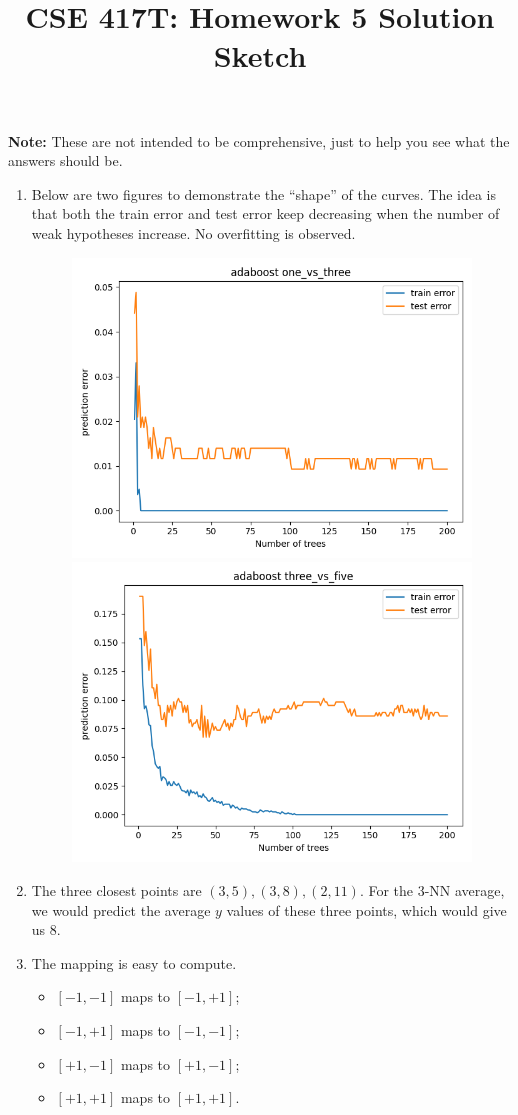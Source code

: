 \documentclass[10pt]{article}
\begin{document}
\title{CSE 417T: Homework 5 Solution Sketch}

\maketitle

\noindent \textbf{Note:} These are not intended to be comprehensive,
just to help you see what the answers should be.


\begin{enumerate}

\item

Below are two figures to demonstrate the ``shape'' of the curves. The idea is that both the train error and test error keep decreasing when the number of weak hypotheses increase.  No overfitting is observed.

\begin{figure}[h]
\begin{center}
    \includegraphics[width=.45\textwidth]{1vs3.png}
    \includegraphics[width=.45\textwidth]{3vs5.png}
\end{center}
\end{figure}

\item
  The three closest points are $(3,
  5), (3, 8), (2, 11)$. For the 3-NN average, we would predict the
  average $y$ values of these three points, which would give us 8. 


\item The mapping is easy to compute. 
\begin{itemize}
	\item $[-1, -1]$ maps to $[-1, +1]$; 
  	\item $[-1, +1]$ maps to $[-1, -1]$; 
    \item $[+1, -1]$ maps to $[+1, -1]$; 
    \item $[+1, +1]$ maps to $[+1, +1]$. 
\end{itemize}


\end{enumerate}
\end{document}
